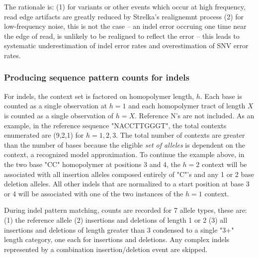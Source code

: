 \documentclass{article}
\begin{document}
The rationale is: (1) for variants or other events which occur at high frequency, read edge artifacts are greatly reduced by Strelka's realignemnt process (2) for low-frequency noise, this is not the case -- an indel error occruing one time near the edge of read, is unlikely to be realigned to reflect the error -- this leads to systematic underestimation of indel error rates and overestimation of SNV error rates.


\subsubsection{Producing sequence pattern counts for indels}

For indels, the context set is factored on homopolymer length, $h$. Each base is counted as a single observation at $h=1$ and each homopolymer tract of length $X$ is counted as a single observation of $h=X$. Reference N's are not included. As an example, in the reference sequence "NACCTTGGGT", the total contexts enumerated are (9,2,1) for $h=1,2,3$. The total number of contexts are greater than the number of bases because the eligible \emph{set of alleles} is dependent on the context, a recognized model approximation. To continue the example above, in the two base "CC" homopolymer at positions 3 and 4, the $h=2$ context will be associated with all insertion alleles composed entirely of "C"'s and any 1 or 2 base deletion alleles. All other indels that are normalized to a start position at base 3 or 4 will be associated with one of the two instances of the $h=1$ context.

During indel pattern matching, counts are recorded for 7 allele types, these are: (1) the reference allele (2) insertions and deletions of length 1 or 2 (3) all insertions and deletions of length greater than 3 condensed to a single "3+" length category, one each for insertions and deletions. Any complex indels represented by a combination insertion/deletion event are skipped.
\end{document}
